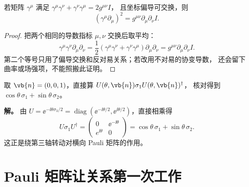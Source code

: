 \begin{proposition}[一阶算子的平方]
若矩阵 \(\gamma^\mu\) 满足
\(\gamma^\mu\gamma^\nu+\gamma^\nu\gamma^\mu=2g^{\mu\nu}I\)，
且坐标偏导可交换，则
\[
(\gamma^\mu\partial_\mu)^2
=g^{\mu\nu}\partial_\mu\partial_\nu I.
\]
\end{proposition}
\begin{proof}
把两个相同的导数指标 \(\mu,\nu\) 交换后取平均：
\[
\gamma^\mu\gamma^\nu\partial_\mu\partial_\nu
=\frac12(\gamma^\mu\gamma^\nu+\gamma^\nu\gamma^\mu)
\partial_\mu\partial_\nu
=g^{\mu\nu}\partial_\mu\partial_\nu I.
\]
第二个等号只用了偏导交换和反对易关系；若改用不对易的协变导数，
还会留下曲率或场强项，不能照搬此证明。
\end{proof}


\par
\begin{workedexample}
取 \(\vb{n}=(0,0,1)\)，直接算
\(U(\theta,\vb{n})\sigma_1U(\theta,\vb{n})^\dagger\)，
核对得到 \(\cos\theta\,\sigma_1+\sin\theta\,\sigma_2\)。


\textbf{解。} 由 \(U=\ee^{-\ii\theta\sigma_3/2}=\operatorname{diag}(\ee^{-\ii\theta/2},\ee^{\ii\theta/2})\)，直接相乘得
\[
U\sigma_1U^\dagger=\begin{pmatrix}0&\ee^{-\ii\theta}\\e^{\ii\theta}&0\end{pmatrix}=\cos\theta\,\sigma_1+\sin\theta\,\sigma_2.
\]
这正是绕第三轴转动对横向 Pauli 矩阵的作用。
\end{workedexample}
\par
\section{Pauli 矩阵让关系第一次工作}

